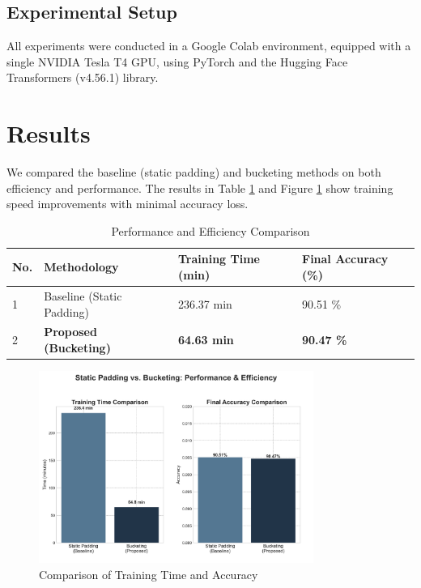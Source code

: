 \documentclass{article}
\begin{document}
\subsection{Experimental Setup}
All experiments were conducted in a Google Colab environment, equipped with a single NVIDIA Tesla T4 GPU, using PyTorch and the Hugging Face Transformers (v4.56.1) library.

\section{Results}

We compared the baseline (static padding) and bucketing methods on both efficiency and performance. The results in Table \ref{tab:performance} and Figure \ref{fig:comparison} show training speed improvements with minimal accuracy loss.

\begin{table}[htbp]
\centering
\caption{Performance and Efficiency Comparison}
\label{tab:performance}
\begin{tabular}{llll}
\toprule
No. & Methodology & Training Time (min) & Final Accuracy (\%) \\
\midrule
1 & Baseline (Static Padding) & 236.37 min & 90.51 \% \\
2 & \textbf{Proposed (Bucketing)} & \textbf{64.63 min} & \textbf{90.47 \%} \\
\bottomrule
\end{tabular}
\end{table}

\begin{figure}[htbp]
\centering
\includegraphics[width=0.8\textwidth]{comparison_graph_eng_v3.png}
\caption{Comparison of Training Time and Accuracy}
\label{fig:comparison}
\end{figure}
\end{document}
